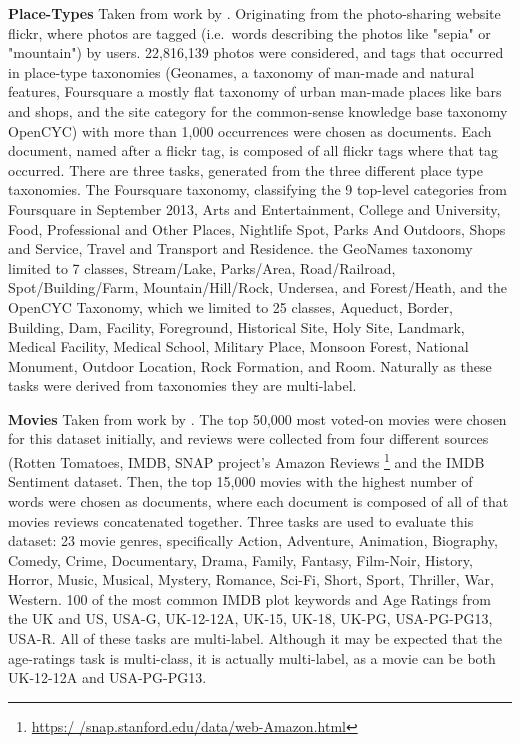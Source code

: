 \textbf{Place-Types} Taken from work by  \cite{Derrac2015}. Originating from the photo-sharing website flickr, where photos are tagged (i.e.\ words describing the photos like "sepia" or "mountain") by users. 22,816,139 photos were considered, and tags that occurred in place-type taxonomies (Geonames, a taxonomy of man-made and natural features, Foursquare a mostly flat taxonomy of urban man-made places like bars and shops, and the site category for the common-sense knowledge base taxonomy OpenCYC) with more than 1,000 occurrences were chosen as documents. Each document, named after a flickr tag, is composed of all flickr tags where that tag occurred. There are three tasks, generated from the three different place type taxonomies. The Foursquare taxonomy, classifying the 9 top-level categories from Foursquare in September 2013, Arts and Entertainment, College and University, Food, Professional and Other Places, Nightlife Spot, Parks And Outdoors, Shops and Service, Travel and Transport and Residence. the GeoNames taxonomy limited to 7 classes, Stream/Lake, Parks/Area, Road/Railroad, Spot/Building/Farm, Mountain/Hill/Rock, Undersea, and Forest/Heath, and the OpenCYC Taxonomy, which we limited to 25 classes, Aqueduct, Border, Building, Dam, Facility, Foreground, Historical Site, Holy Site, Landmark, Medical Facility, Medical School, Military Place, Monsoon Forest, National Monument, Outdoor Location, Rock Formation, and Room. Naturally as these tasks were derived from taxonomies they are multi-label.\label{datasets:Place-Types}

\textbf{Movies} Taken from work by  \cite{Derrac2015}. The top 50,000 most voted-on movies were chosen for this dataset initially, and reviews were collected from four different sources (Rotten Tomatoes, IMDB, SNAP project's Amazon Reviews \footnote{\url{https:/ /snap.stanford.edu/data/web-Amazon.html}} and the IMDB Sentiment dataset. Then, the top 15,000 movies with the highest number of words were chosen as documents, where each document is composed of all of that movies reviews concatenated together. Three tasks are used to evaluate this dataset: 23 movie genres, specifically Action, Adventure, Animation, Biography, Comedy, Crime, Documentary, Drama, Family, Fantasy, Film-Noir, History, Horror, Music, Musical, Mystery, Romance, Sci-Fi, Short, Sport, Thriller, War, Western. 100 of the most common IMDB plot keywords and Age Ratings from the UK and US, USA-G, UK-12-12A, UK-15, UK-18, UK-PG, USA-PG-PG13, USA-R. All of these tasks are multi-label. Although it may be expected that the age-ratings task is multi-class, it is actually multi-label, as a movie can be both UK-12-12A and USA-PG-PG13. \label{datasets:movies} 


